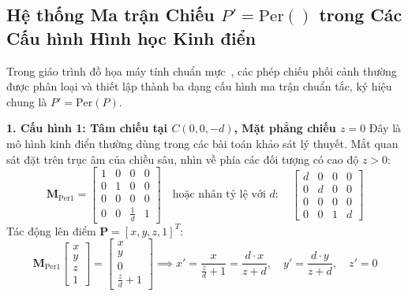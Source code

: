 \subsection{Hệ thống Ma trận Chiếu \texorpdfstring{$P' = \text{Per}()$}{P' = Per()} trong Các Cấu hình Hình học Kinh điển}
\label{subsec:canonical_perspective_matrices}

Trong giáo trình đồ họa máy tính chuẩn mực~\citep{hearn2004computer,foley1996computer}, các phép chiếu phối cảnh thường được phân loại và thiết lập thành ba dạng cấu hình ma trận chuẩn tắc, ký hiệu chung là $P' = \text{Per}(P)$.

\textbf{1. Cấu hình 1: Tâm chiếu tại \texorpdfstring{$C(0, 0, -d)$}{C(0, 0, -d)}, Mặt phẳng chiếu \texorpdfstring{$z = 0$}{z = 0}}
Đây là mô hình kinh điển thường dùng trong các bài toán khảo sát lý thuyết. Mắt quan sát đặt trên trục âm của chiều sâu, nhìn về phía các đối tượng có cao độ $z > 0$:
\begin{equation}
\label{eq:per_config_1}
\mathbf{M}_{\text{Per1}} = \begin{bmatrix}
1 & 0 & 0 & 0 \\
0 & 1 & 0 & 0 \\
0 & 0 & 0 & 0 \\
0 & 0 & \frac{1}{d} & 1
\end{bmatrix} \quad \text{hoặc nhân tỷ lệ với } d: \quad
\begin{bmatrix}
d & 0 & 0 & 0 \\
0 & d & 0 & 0 \\
0 & 0 & 0 & 0 \\
0 & 0 & 1 & d
\end{bmatrix}
\end{equation}
Tác động lên điểm $\mathbf{P} = [x, y, z, 1]^T$:
\begin{equation}
\mathbf{M}_{\text{Per1}} \begin{bmatrix} x \\ y \\ z \\ 1 \end{bmatrix} = \begin{bmatrix} x \\ y \\ 0 \\ \frac{z}{d} + 1 \end{bmatrix} \implies x' = \frac{x}{\frac{z}{d} + 1} = \frac{d \cdot x}{z + d}, \quad y' = \frac{d \cdot y}{z + d}, \quad z' = 0
\end{equation}

